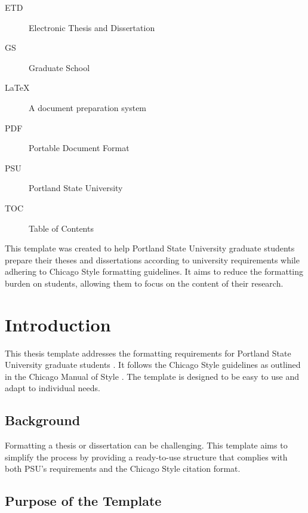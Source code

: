 \documentclass{psu-thesis}
\begin{document}
\begin{psuglossary}
\begin{description}
    \item[ETD] Electronic Thesis and Dissertation
    \item[GS] Graduate School
    \item[LaTeX] A document preparation system
    \item[PDF] Portable Document Format
    \item[PSU] Portland State University
    \item[TOC] Table of Contents
\end{description}
\end{psuglossary}

\begin{psupreface}
This template was created to help Portland State University graduate students prepare their theses and dissertations according to university requirements while adhering to Chicago Style formatting guidelines. It aims to reduce the formatting burden on students, allowing them to focus on the content of their research.

\lipsum[3]
\end{psupreface}

\startbody

\chapter{Introduction}

This thesis template addresses the formatting requirements for Portland State University graduate students \autocite{portland}. It follows the Chicago Style guidelines as outlined in the Chicago Manual of Style \autocite{chicago}. The template is designed to be easy to use and adapt to individual needs.

\section{Background}

Formatting a thesis or dissertation can be challenging. This template aims to simplify the process by providing a ready-to-use structure that complies with both PSU's requirements and the Chicago Style citation format.

\section{Purpose of the Template}
\end{document}
